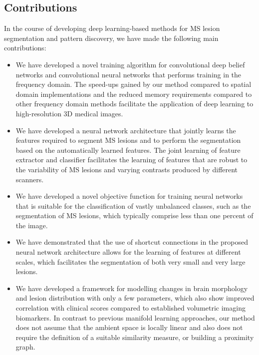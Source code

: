 \subsection{Contributions}

In the course of developing deep learning-based
methods for MS lesion segmentation and pattern discovery, we have made
the following main contributions:
\begin{itemize}
\item We have developed a novel training algorithm for convolutional deep belief
networks and convolutional neural networks that performs training in the
frequency domain. The speed-ups gained by our method compared to spatial domain
implementations and the reduced memory requirements compared to other frequency
domain methods facilitate the application of deep learning to high-resolution
3D medical images.
  
\item We have developed a neural network architecture that jointly learns the
features required to segment MS lesions and to perform the segmentation based on
the automatically learned features. The joint learning of feature extractor and
classifier facilitates the learning of features that are robust to the
variability of MS lesions and varying contrasts produced by different scanners.

\item We have developed a novel objective function for training neural networks
that is suitable for the classification of vastly unbalanced classes, such as
the segmentation of MS lesions, which typically comprise less than one percent
of the image.

\item We have demonstrated that the use of shortcut connections in the proposed
neural network architecture allows for the learning of features at different
scales, which facilitates the segmentation of both very small and very large
lesions.

\item We have developed a framework for modelling changes in brain morphology
and lesion distribution with only a few parameters, which also show improved
correlation with clinical scores compared to established volumetric imaging
biomarkers. In contrast to previous manifold learning approaches, our method
does not assume that the ambient space is locally linear and also does not
require the definition of a suitable similarity measure, or building a proximity
graph.
\end{itemize}

